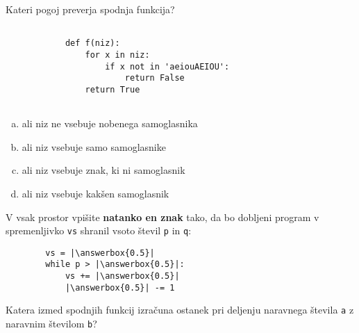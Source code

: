 \documentclass[arhiv, 10pt]{../izpit}
\newcommand{\inlinepy}[1]{\texttt{#1}}
\newcommand{\answerbox}[1]{\framebox{\vphantom{\large M}\hspace{#1cm}}}
\begin{document}
        \naloga*

        \begin{multicols}{2}
        \noindent
        Kateri pogoj preverja spodnja funkcija?
        \begin{verbatim}
        
            def f(niz):
                for x in niz:
                    if x not in 'aeiouAEIOU':
                        return False
                return True
            
        \end{verbatim}

        \begin{enumerate}[(a)]
\item ali niz ne vsebuje nobenega samoglasnika
\item ali niz vsebuje samo samoglasnike
\item ali niz vsebuje znak, ki ni samoglasnik
\item ali niz vsebuje kakšen samoglasnik
\end{enumerate}

        \end{multicols}
    
        \naloga*
        \begin{multicols}{2}
        \noindent
        V vsak prostor vpišite \textbf{natanko en znak} tako, da bo dobljeni program v spremenljivko \inlinepy{vs} shranil vsoto števil \inlinepy{p} in \inlinepy{q}:
        
        \columnbreak
        \begin{verbatim}
        vs = |\answerbox{0.5}|
        while p > |\answerbox{0.5}|:
            vs += |\answerbox{0.5}|
            |\answerbox{0.5}| -= 1
        \end{verbatim}
        \end{multicols}
    
        \clearpage
        \naloga
        
        Katera izmed spodnjih funkcij izračuna ostanek pri deljenju naravnega števila \inlinepy{a} z naravnim številom \inlinepy{b}?
    
\end{document}
